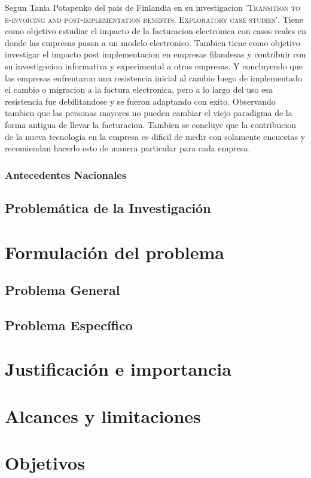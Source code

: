 \documentclass[12pt,a4paper,openany,oneside]{book}
\begin{document}
                Segun Tania Potapenko del pais de Finlandia en su investigacion \textsc{'Transition to e-invoicing and post-implementation benefits. Exploratory case studies'}. Tiene como objetivo estudiar el impacto de la facturacion electronica con casos reales en donde las empresas pasan a un modelo electronico. Tambien tiene como objetivo investigar el impacto post implementacion en empresas filandesas y contribuir con su investigacion informativa y experimental a otras empresas. Y concluyendo que las empresas enfrentaron una resistencia inicial al cambio luego de implementado el cambio o migracion a la factura electronica, pero a lo largo del uso esa resistencia fue debilitandose y se fueron adaptando con exito. Observando tambien que las personas mayores no pueden cambiar el viejo paradigma de la forma antigua de llevar la facturacion. Tambien se concluye que la contribucion de la nueva tecnologia en la empresa es dificil de medir con solamente encuestas y recomiendan hacerlo esto de manera particular para cada empresa.
                
                \subsubsection{Antecedentes Nacionales}
            \subsection{Problemática de la Investigación}
        \section{Formulación del problema}
            \subsection{Problema General}
            \subsection{Problema Específico}            
        \section{Justificación e importancia}
        \section{Alcances y limitaciones}
        \section{Objetivos}
\end{document}
